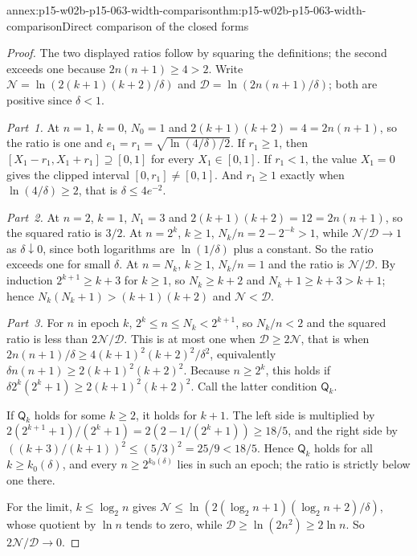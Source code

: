 \begin{annexitem}{annex:p15-w02b-p15-063-width-comparison}{thm:p15-w02b-p15-063-width-comparison}{Direct comparison of the closed forms}
\begin{proof}
The two displayed ratios follow by squaring the definitions; the second
exceeds one because \(2n(n+1)\geq4>2\). Write
\(\mathcal N=\ln(2(k+1)(k+2)/\delta)\) and
\(\mathcal D=\ln(2n(n+1)/\delta)\); both are positive since
\(\delta<1\).

\emph{Part~1.} At \(n=1\), \(k=0\), \(N_0=1\) and
\(2(k+1)(k+2)=4=2n(n+1)\), so the ratio is one and
\(e_1=r_1=\sqrt{\ln(4/\delta)/2}\). If \(r_1\geq1\), then
\([X_1-r_1,X_1+r_1]\supseteq[0,1]\) for every \(X_1\in[0,1]\). If \(r_1<1\),
the value \(X_1=0\) gives the clipped interval \([0,r_1]\ne[0,1]\).
And \(r_1\geq1\) exactly when \(\ln(4/\delta)\geq2\), that is
\(\delta\leq4e^{-2}\).

\emph{Part~2.} At \(n=2\), \(k=1\), \(N_1=3\) and \(2(k+1)(k+2)=12=2n(n+1)\),
so the squared ratio is \(3/2\). At \(n=2^k\), \(k\geq1\),
\(N_k/n=2-2^{-k}>1\), while \(\mathcal N/\mathcal D\to1\) as
\(\delta\downarrow0\), since both logarithms are \(\ln(1/\delta)\) plus a
constant. So the ratio exceeds one for small \(\delta\).
At \(n=N_k\), \(k\geq1\), \(N_k/n=1\) and the ratio is
\(\mathcal N/\mathcal D\). By induction \(2^{k+1}\geq k+3\) for \(k\geq1\),
so \(N_k\geq k+2\) and \(N_k+1\geq k+3>k+1\); hence
\(N_k(N_k+1)>(k+1)(k+2)\) and \(\mathcal N<\mathcal D\).

\emph{Part~3.} For \(n\) in epoch \(k\), \(2^k\leq n\leq N_k<2^{k+1}\), so
\(N_k/n<2\) and the squared ratio is less than \(2\mathcal N/\mathcal D\).
This is at most one when \(\mathcal D\geq2\mathcal N\), that is when
\(2n(n+1)/\delta\geq4(k+1)^2(k+2)^2/\delta^2\), equivalently
\(\delta n(n+1)\geq2(k+1)^2(k+2)^2\). Because \(n\geq2^k\), this holds if
\(\delta2^k(2^k+1)\geq2(k+1)^2(k+2)^2\). Call the latter condition
\(\mathsf Q_k\).

If \(\mathsf Q_k\) holds for some \(k\geq2\), it holds for \(k+1\). The
left side is multiplied by
\(2(2^{k+1}+1)/(2^k+1)=2(2-1/(2^k+1))\geq18/5\), and the right side by
\(((k+3)/(k+1))^2\leq(5/3)^2=25/9<18/5\). Hence \(\mathsf Q_k\) holds for
all \(k\geq k_0(\delta)\), and every \(n\geq2^{k_0(\delta)}\) lies in such
an epoch; the ratio is strictly below one there.

For the limit, \(k\leq\log_2n\) gives
\(\mathcal N\leq\ln(2(\log_2n+1)(\log_2n+2)/\delta)\), whose quotient by
\(\ln n\) tends to zero, while \(\mathcal D\geq\ln(2n^2)\geq2\ln n\). So
\(2\mathcal N/\mathcal D\to0\).


\end{proof}
\end{annexitem}
